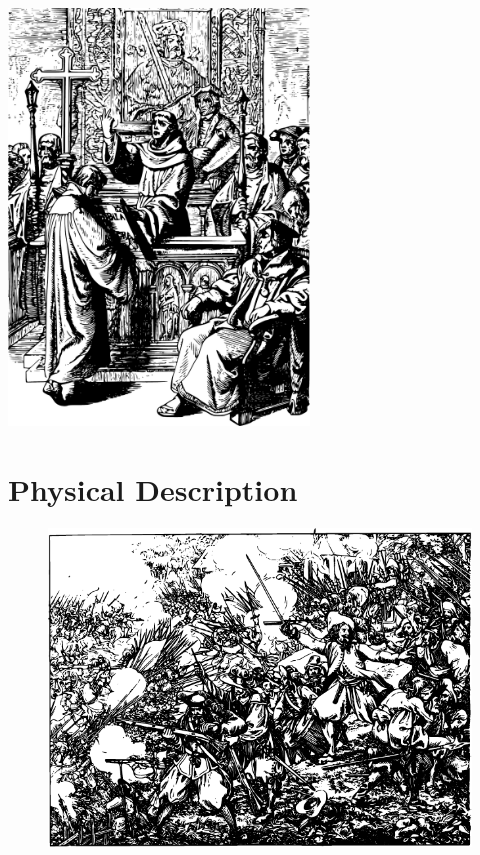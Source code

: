\documentclass[12pt]{book}  %
\begin{document}
\begin{center}
    \includegraphics[width=0.6\textwidth]{./images/religion06.pdf}
\end{center}


\chapter{Physical Description}

\begin{figure}[h]
    \centering
    \includegraphics[width=\textwidth]{./images/physical_05.pdf}
\end{figure}
\end{document}
